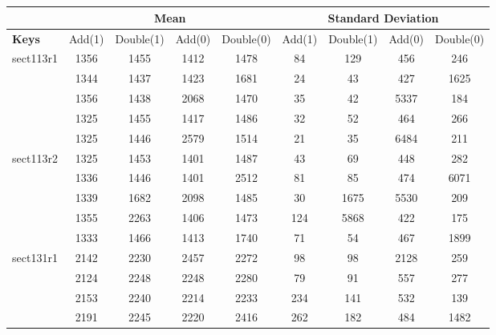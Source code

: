 \documentclass[a4paper, 8pt, envcountsect, runningheads]{article}
\begin{document}
\section*{}
\begin{center}
	\begin{longtable}{ |l|c|c|c|c|c|c|c|c| }
	\hline 
	& \multicolumn{4}{|c|}{\textbf{Mean}} & \multicolumn{4}{|c|}{\textbf{Standard Deviation}} \\ \hline 
	\textbf{Keys} & Add(1) & Double(1) & Add(0) & Double(0) & Add(1) & Double(1) & Add(0) & Double(0) \\ \hline \endfirsthead
	

	sect113r1 & 1356 & 1455 & 1412 & 1478 & 84 & 129 & 456 & 246 \\
	
	 & 1344 & 1437 & 1423 & 1681 & 24 & 43 & 427 & 1625 \\
	 
	 & 1356 & 1438 & 2068 & 1470 & 35 & 42 & 5337 & 184 \\
	 
	 & 1325 & 1455 & 1417 & 1486 & 32 & 52 & 464 & 266 \\
	 
	 & 1325 & 1446 & 2579 & 1514 & 21 & 35 & 6484 & 211 \\ \hline
	 
	 sect113r2 & 1325 & 1453 & 1401 & 1487 & 43 & 69 & 448 & 282 \\
	 
	 & 1336 & 1446 & 1401 & 2512 & 81 & 85 & 474 & 6071 \\
	 	 
	 & 1339 & 1682 & 2098 & 1485 & 30 & 1675 & 5530 & 209 \\
	 
	 & 1355 & 2263 & 1406 & 1473 & 124 & 5868 & 422 & 175 \\
	 
	 & 1333 & 1466 & 1413 & 1740 & 71 & 54 & 467 & 1899 \\ \hline
	 	 
	sect131r1 & 2142 & 2230 & 2457 & 2272 & 98 & 98 & 2128 & 259 \\
	 
	 & 2124 & 2248 & 2248 & 2280 & 79 & 91 & 557 & 277 \\
	 	 
	 & 2153 & 2240 & 2214 & 2233 & 234 & 141 & 532 & 139 \\
	 
	 & 2191 & 2245 & 2220 & 2416 & 262 & 182 & 484 & 1482 \\
	 

\end{longtable}
\end{center}
\end{document}
